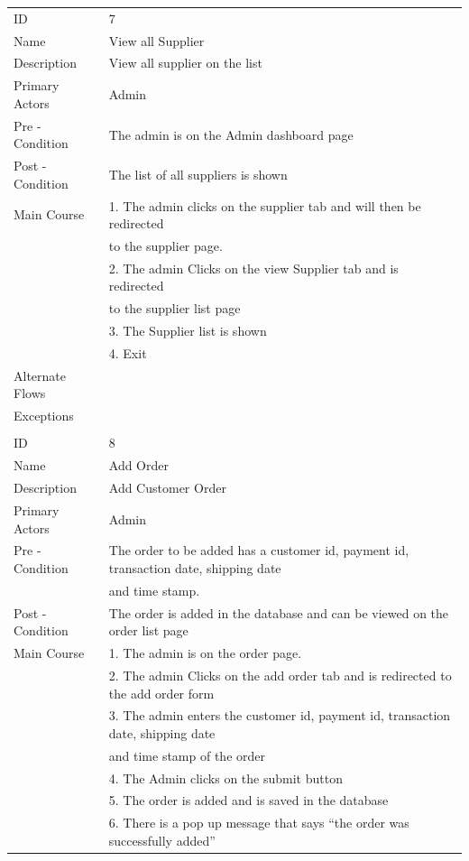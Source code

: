 \documentclass{report}
\begin{document}
\begin{tabular}{ l l }
ID 					& 7 \\
Name 				& View all Supplier \\
Description 			& View all supplier on the list \\ 
Primary Actors 		& Admin \\
Pre - Condition 		& The admin is on the Admin dashboard page \\ 
Post - Condition 	& The list of all suppliers is shown \\ 
Main Course			& 1. The admin clicks on the supplier tab and will then be redirected \\ 
					& \quad \thinspace to the  supplier page. \\
					& 2. The admin Clicks on the view Supplier tab and is redirected \\ 
					& \quad \thinspace to the supplier list page \\
					& 3. The Supplier list is shown \\
					& 4. Exit \\
Alternate Flows		& \\
Exceptions 			& \\ \\
ID 					& 8 \\
Name 				& Add Order \\
Description 			& Add Customer Order \\ 
Primary Actors 		& Admin \\
Pre - Condition 		& The order to be added has a customer id, payment id, transaction date, shipping date \\
					& \quad \thinspace and time stamp. \\ 
Post - Condition 	& The order is added in the database and can be viewed on the order list page \\ 
Main Course			& 1. The admin is on the  order page. \\
					& 2. The admin Clicks on the add order tab and is redirected to the add order form \\
					& 3. The admin enters the customer id, payment id, transaction date, shipping date \\
					& \quad \thinspace and time stamp of the order \\
					& 4. The Admin clicks on the submit button \\
					& 5. The order is added and is saved in the database \\
					& 6. There is a pop up message that says “the order was successfully added” \\

\end{tabular}
\end{document}
